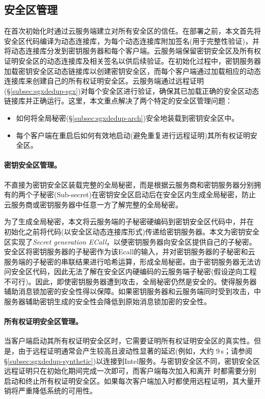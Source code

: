 \subsection{安全区管理}
\label{subsec:sgxdedup-enclave-management}

\sysnameS 在首次初始化时通过云服务端建立对所有安全区的信任。在\sysnameS 部署之前，本文首先将安全区代码编译为动态连接库\cite{sgx}，为每个动态连接库附加签名(用于完整性验证)，并将动态连接库分发到密钥服务器和每个客户端。云服务端保留密钥安全区及所有权证明安全区的动态连接库及相关签名以供后续验证。在初始化过程中，密钥服务器加载密钥安全区动态链接库以创建密钥安全区，而每个客户端通过加载相应的动态连接库来创建自己的所有权证明安全区。云服务端通过远程证明(\S\ref{subsec:sgxdedup-sgx})对每个安全区进行验证，确保其已加载正确的安全区动态链接库并正确运行。这里，本文重点解决了两个特定的安全区管理问题：

\begin{itemize}
    \item 如何将全局秘密(\S\ref{subsec:sgxdedup-arch})安全地装载到密钥安全区中。
    \item 每个客户端在重启后如何有效地启动(避免重复进行远程证明)其所有权证明安全区。
\end{itemize}

\paragraph*{密钥安全区管理。}\sysnameS 不直接为密钥安全区装载完整的全局秘密，而是根据云服务商和密钥服务器分别拥有的两个子秘密(Sub-secret)在密钥安全区启动后在安全区内生成全局秘密，防止云服务商或密钥服务器中任意一方了解完整的全局秘密。

为了生成全局秘密，本文将云服务端的子秘密硬编码到密钥安全区代码中，并在 \sysnameS 初始化之前将代码(以安全区动态连接库形式)传递给密钥服务器。本文为密钥安全区实现了\textit{Secret generation ECall}，以便密钥服务器向安全区提供自己的子秘密。安全区将密钥服务器的子秘密作为该Ecall的输入，并对密钥服务器的子秘密和云服务端的子秘密的串联结果进行哈希运算，形成全局秘密。由于密钥服务器无法访问安全区代码，因此无法了解在安全区内硬编码的云服务端子秘密(假设逆向工程不可行)。因此，即使密钥服务器遭到攻击，全局秘密仍然是安全的。使得服务器辅助消息锁加密的安全性得以保障。如果密钥服务器和云服务端同时受到攻击，\sysnameS 中服务器辅助密钥生成的安全性会降低到原始消息锁加密的安全性。

\paragraph*{所有权证明安全区管理。} 当客户端启动其所有权证明安全区时，它​​需要证明所有权证明安全区的真实性。但是，由于远程证明通常会产生较高且波动性显著的延迟(例如，大约 9\,s；请参阅 \S\ref{subsec:sgxdedup-synthetic})以连接到Intel服务。与密钥安全区不同，密钥安全区远程证明只在初始化期间完成一次即可，而客户端每次加入和离开 \sysnameS 时都需要分别启动和终止所有权证明安全区。如果每次客户端加入时都使用远程证明，其大量开销将严重降低\sysnameS 系统的可用性。

